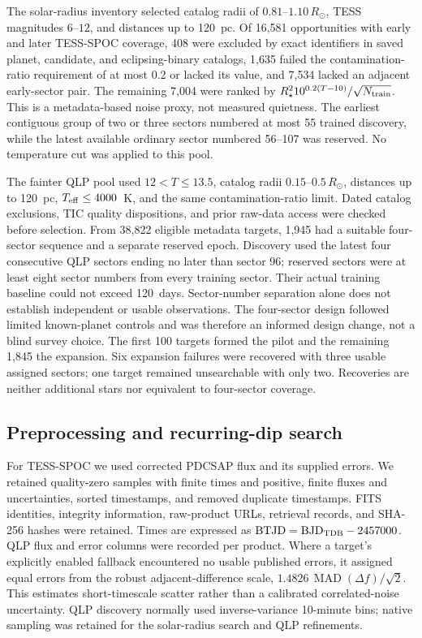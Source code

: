 The solar-radius inventory selected catalog radii of
$0.81$--$1.10\,R_\odot$, TESS magnitudes $6$--$12$, and distances
up to 120~pc. Of 16,581 opportunities with early and later TESS-SPOC coverage,
408 were excluded by exact identifiers in saved planet, candidate, and
eclipsing-binary catalogs, 1,635 failed the contamination-ratio requirement
of at most 0.2 or lacked its value, and 7,534 lacked an adjacent early-sector
pair. The remaining 7,004 were ranked by
$R_\star^2 10^{0.2(T-10)}/\sqrt{N_{\rm train}}$.
This is a metadata-based noise proxy, not measured quietness.
The earliest contiguous group of two or three sectors numbered at most 55
trained discovery, while the latest available ordinary sector numbered
56--107 was reserved. No temperature cut was applied to this pool.

The fainter QLP pool used $12<T\leq13.5$, catalog radii
$0.15$--$0.5\,R_\odot$, distances up to 120~pc,
$T_{\rm eff}\leq4000$~K, and the same contamination-ratio limit.
Dated catalog exclusions, TIC quality dispositions, and prior raw-data
access were checked before selection. From 38,822 eligible metadata targets,
1,945 had a suitable four-sector sequence and a separate reserved epoch.
Discovery used the latest four consecutive QLP sectors ending no later
than sector 96; reserved sectors were at least eight sector numbers from
every training sector. Their actual training baseline could not exceed
120~days. Sector-number separation alone does not establish independent
or usable observations. The four-sector design followed limited known-planet
controls and was therefore an informed design change, not a blind survey
choice. The first 100 targets formed the pilot and the remaining 1,845 the
expansion. Six expansion failures were recovered with three usable assigned
sectors; one target remained unsearchable with only two. Recoveries are
neither additional stars nor equivalent to four-sector coverage.

\subsection{Preprocessing and recurring-dip search}

For TESS-SPOC we used corrected PDCSAP flux and its supplied errors.
We retained quality-zero samples with finite times and positive, finite fluxes
and uncertainties, sorted timestamps, and removed duplicate timestamps.
FITS identities, integrity information, raw-product URLs, retrieval records,
and SHA-256 hashes were retained. Times are expressed as
${\rm BTJD}={\rm BJD}_{\rm TDB}-2457000$.
QLP flux and error columns were recorded per product. Where a target's
explicitly enabled fallback encountered no usable published errors, it
assigned equal errors from the robust adjacent-difference scale,
$1.4826\,\operatorname{MAD}(\Delta f)/\sqrt{2}$.
This estimates short-timescale scatter rather than a calibrated correlated-noise
uncertainty. QLP discovery normally used inverse-variance 10-minute bins;
native sampling was retained for the solar-radius search and QLP refinements.

